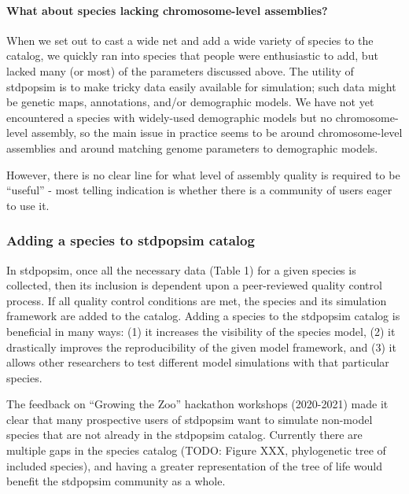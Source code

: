 \documentclass[hidelinks]{article}
\begin{document}
\hypertarget{what-about-species-lacking-chromosome-level-assemblies}{%
\paragraph{What about species lacking chromosome-level
assemblies?}\label{what-about-species-lacking-chromosome-level-assemblies}}

When we set out to cast a wide net and add a wide variety of species to
the catalog, we quickly ran into species that people were enthusiastic
to add, but lacked many (or most) of the parameters discussed above. The
utility of stdpopsim is to make tricky data easily available for
simulation; such data might be genetic maps, annotations, and/or
demographic models. We have not yet encountered a species with
widely-used demographic models but no chromosome-level assembly, so the
main issue in practice seems to be around chromosome-level assemblies
and around matching genome parameters to demographic models.

However, there is no clear line for what level of assembly quality is
required to be ``useful'' - most telling indication is whether there is
a community of users eager to use it.

\hypertarget{adding-a-species-to-stdpopsim-catalog}{%
\subsubsection{Adding a species to stdpopsim
catalog}\label{adding-a-species-to-stdpopsim-catalog}}

In stdpopsim, once all the necessary data (Table 1) for a given species
is collected, then its inclusion is dependent upon a peer-reviewed
quality control process. If all quality control conditions are met, the
species and its simulation framework are added to the catalog. Adding a
species to the stdpopsim catalog is beneficial in many ways: (1) it
increases the visibility of the species model, (2) it drastically
improves the reproducibility of the given model framework, and (3) it
allows other researchers to test different model simulations with that
particular species.

The feedback on ``Growing the Zoo'' hackathon workshops (2020-2021) made
it clear that many prospective users of stdpopsim want to simulate
non-model species that are not already in the stdpopsim catalog.
Currently there are multiple gaps in the species catalog (TODO: Figure
XXX, phylogenetic tree of included species), and having a greater
representation of the tree of life would benefit the stdpopsim community
as a whole.
\end{document}
